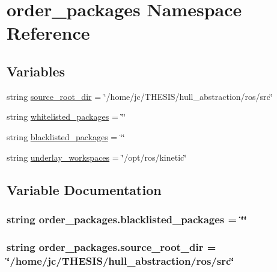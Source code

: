 \hypertarget{namespaceorder__packages}{}\section{order\+\_\+packages Namespace Reference}
\label{namespaceorder__packages}
\subsection*{Variables}
\begin{DoxyCompactItemize}
\item 
string \hyperlink{namespaceorder__packages_aff4fd297841de7fbddc2c0c33a6bab21}{source\+\_\+root\+\_\+dir} = \char`\"{}/home/jc/T\+H\+E\+S\+IS/hull\+\_\+abstraction/ros/src\char`\"{}
\item 
string \hyperlink{namespaceorder__packages_a84450a73e77dbf3689293b97dcb697a4}{whitelisted\+\_\+packages} = \char`\"{}\char`\"{}
\item 
string \hyperlink{namespaceorder__packages_a29ea913f00c5a0e81d3c7688e7375507}{blacklisted\+\_\+packages} = \char`\"{}\char`\"{}
\item 
string \hyperlink{namespaceorder__packages_a11d102ff09fd2977b9075c4c722015d2}{underlay\+\_\+workspaces} = \char`\"{}/opt/ros/kinetic\char`\"{}
\end{DoxyCompactItemize}


\subsection{Variable Documentation}
\subsubsection[{\texorpdfstring{blacklisted\+\_\+packages}{blacklisted_packages}}]{\setlength{\rightskip}{0pt plus 5cm}string order\+\_\+packages.\+blacklisted\+\_\+packages = \char`\"{}\char`\"{}}\hypertarget{namespaceorder__packages_a29ea913f00c5a0e81d3c7688e7375507}{}\label{namespaceorder__packages_a29ea913f00c5a0e81d3c7688e7375507}
\subsubsection[{\texorpdfstring{source\+\_\+root\+\_\+dir}{source_root_dir}}]{\setlength{\rightskip}{0pt plus 5cm}string order\+\_\+packages.\+source\+\_\+root\+\_\+dir = \char`\"{}/home/jc/T\+H\+E\+S\+IS/hull\+\_\+abstraction/ros/src\char`\"{}}\hypertarget{namespaceorder__packages_aff4fd297841de7fbddc2c0c33a6bab21}{}\label{namespaceorder__packages_aff4fd297841de7fbddc2c0c33a6bab21}
